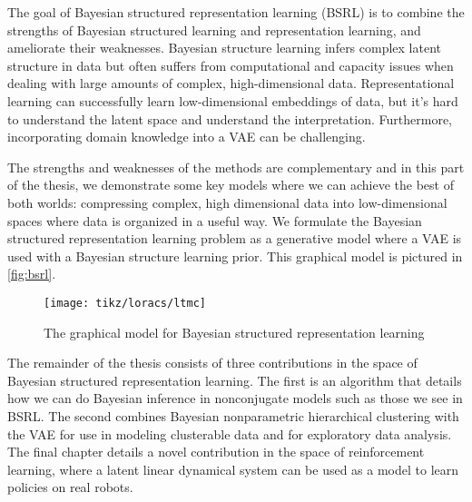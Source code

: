 The goal of Bayesian structured
representation learning (BSRL)
is to combine the strengths of
Bayesian structured learning
and representation learning,
and ameliorate their weaknesses.
Bayesian structure learning
infers complex latent structure
in data but often suffers from
computational and capacity issues
when dealing with large amounts of
complex, high-dimensional data.
Representational learning can
successfully learn low-dimensional
embeddings of data, but
it's hard to understand the
latent space and understand the interpretation.
Furthermore, incorporating
domain knowledge into a VAE
can be challenging.

The strengths and weaknesses of 
the methods are complementary
and in this part of the thesis, we demonstrate
some key models where we can
achieve the best of both worlds:
compressing complex, high dimensional
data into low-dimensional spaces
where data is organized in a useful way.
We formulate the Bayesian structured
representation learning problem
as a generative model
where a VAE is used
with a Bayesian structure learning prior.
This graphical model is pictured in 
\autoref{fig:bsrl}.

\begin{figure}[H]
    \centering
    \texttt{[image: tikz/loracs/ltmc]}
    \caption{The graphical model for
    Bayesian structured representation learning}
    \label{fig:bsrl}
\end{figure}

The remainder of the thesis
consists of three
contributions in the space of Bayesian
structured representation learning.
The first
is an algorithm that details how
we can do Bayesian inference in
nonconjugate models
such as those we see in BSRL.
The second combines Bayesian nonparametric
hierarchical clustering with
the VAE for use in modeling
clusterable data and for exploratory data analysis.
The final chapter details a novel
contribution in the space
of reinforcement learning, where
a latent linear dynamical system
can be used as a model to learn
policies on real robots.